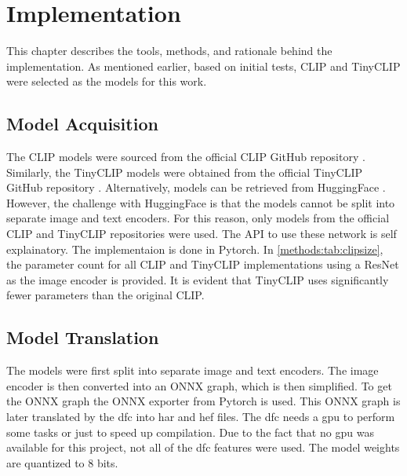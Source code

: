 \chapter{Implementation
    \label{chapter:implementation}}

This chapter describes the tools, methods, and rationale behind the implementation. 
As mentioned earlier, based on initial tests, CLIP and TinyCLIP were selected as the models for this work.


\section{Model Acquisition}

The CLIP models were sourced from the official CLIP GitHub repository \cite{clipgit}.
Similarly, the TinyCLIP models were obtained from the official TinyCLIP GitHub repository \cite{tinyclipgit}.
Alternatively, models can be retrieved from HuggingFace \cite{huggingface}.
However, the challenge with HuggingFace is that the models cannot be split into separate image and text encoders.
For this reason, only models from the official CLIP and TinyCLIP repositories were used.
The API to use these network is self explainatory.
The implementaion is done in Pytorch\cite{pytorch}.
In \cref{methods:tab:clipsize}, the parameter count for all CLIP and TinyCLIP implementations using a ResNet as the image encoder is provided.
It is evident that TinyCLIP uses significantly fewer parameters than the original CLIP.

\section{Model Translation
\label{implementation:sec:translation}}

The models were first split into separate image and text encoders.
The image encoder is then converted into an ONNX graph, which is then simplified.
To get the ONNX graph the ONNX exporter from Pytorch is used.
This ONNX graph is later translated by the \acrshort{dfc} into \acrshort{har} and \acrshort{hef} files.
The \acrshort{dfc} needs a \acrshort{gpu} to perform some tasks or just to speed up compilation.
Due to the fact that no \acrshort{gpu} was available for this project, not all of the \acrshort{dfc} features were used.
The model weights are quantized to 8 bits.


